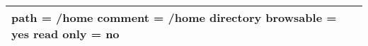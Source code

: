 

\begin{tabular}{|>{\raggedright}p{379pt}|}
\hline
[home]\linebreak{}
path = /home\linebreak{}
comment = /home directory\linebreak{}
browsable = yes\linebreak{}
read only = no\tabularnewline
\hline
\end{tabular}

